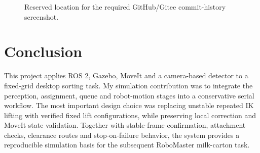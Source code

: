 \documentclass[11pt,a4paper]{article}
\begin{document}
\begin{figure}[H]
\centering
{}
\caption{Reserved location for the required GitHub/Gitee commit-history screenshot.}
\label{fig:commit-history}
\end{figure}

\section{Conclusion}

This project applies ROS 2, Gazebo, MoveIt and a camera-based detector to a fixed-grid desktop sorting task. My simulation contribution was to integrate the perception, assignment, queue and robot-motion stages into a conservative serial workflow. The most important design choice was replacing unstable repeated IK lifting with verified fixed lift configurations, while preserving local correction and MoveIt state validation. Together with stable-frame confirmation, attachment checks, clearance routes and stop-on-failure behavior, the system provides a reproducible simulation basis for the subsequent RoboMaster milk-carton task.
\end{document}
